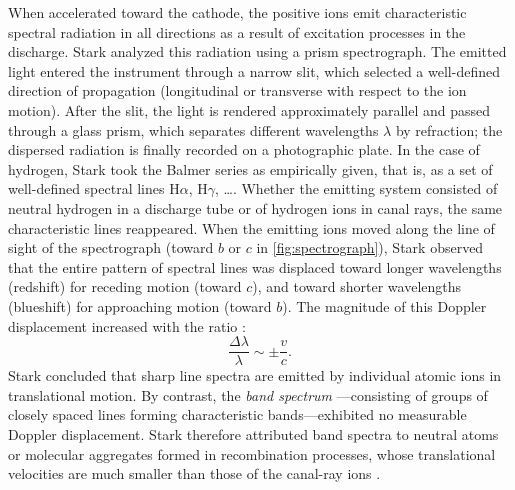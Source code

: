 \documentclass[pdflatex,sn-basic]{sn-jnl}
\begin{document}
When accelerated toward the cathode, the positive ions emit characteristic spectral radiation in all directions as a result of excitation processes in the discharge. Stark analyzed this radiation using a prism spectrograph. The emitted light entered the instrument through a narrow slit, which selected a well-defined direction of propagation (longitudinal or transverse with respect to the ion motion). After the slit, the light is rendered approximately parallel and passed through a glass prism, which separates different wavelengths $\lambda$ by refraction; the dispersed radiation is finally recorded on a photographic plate. In the case of hydrogen, Stark took the Balmer series as empirically given, that is, as a set of well-defined spectral lines $\mathrm{H}\alpha$, $\mathrm{H}\gamma$, \dots \citep[417]{Stark1906}. Whether the emitting system consisted of neutral hydrogen in a discharge tube or of hydrogen ions in canal rays, the same characteristic lines reappeared. When the emitting ions moved along the line of sight of the spectrograph (toward $b$ or $c$ in \cref{fig:spectrograph}), Stark observed that the entire pattern of spectral lines was displaced toward longer wavelengths (redshift) for receding motion (toward $c$), and toward shorter wavelengths (blueshift) for approaching motion (toward $b$). The magnitude of this Doppler displacement increased with the ratio \betafactorh:
%
\begin{equation*}
\frac{\Delta\lambda}{\lambda} \sim \pm \frac{v}{c}.
\end{equation*}
%
Stark concluded that sharp line spectra  are emitted by individual atomic ions in translational motion. By contrast, the \emph{band spectrum} ---consisting of groups of closely spaced lines forming characteristic bands---exhibited no measurable Doppler displacement. Stark therefore attributed band spectra to neutral atoms or molecular aggregates formed in recombination processes, whose translational velocities are much smaller than those of the canal-ray ions \citep[426]{Stark1906}.
\end{document}
